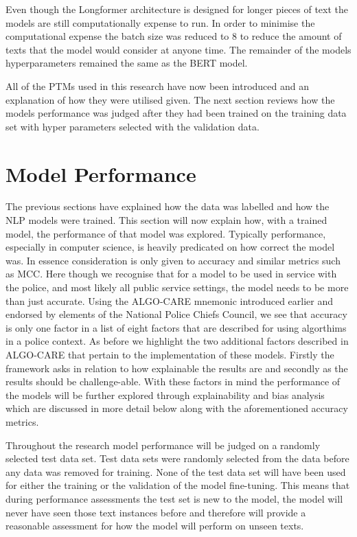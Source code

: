Even though the Longformer architecture is designed for longer pieces of text the models are still computationally expense to run. In order to minimise the computational expense the batch size was reduced to 8 to reduce the amount of texts that the model would consider at anyone time. The remainder of the models hyperparameters remained the same as the BERT model.

All of the PTMs used in this research have now been introduced and an explanation of how they were utilised given. The next section reviews how the models performance was judged after they had been trained on the training data set with hyper parameters selected with the validation data.


\section{Model Performance} The previous sections have explained how the data was labelled and how the NLP models were trained. This section will now explain how, with a trained model, the performance of that model was explored. Typically performance, especially in computer science, is heavily predicated on how correct the model was. In essence consideration is only given to accuracy and similar metrics such as MCC. Here though we recognise that for a model to be used in service with the police, and most likely all public service settings, the model needs to be more than just accurate. Using the ALGO-CARE mnemonic introduced earlier and endorsed by elements of the National Police Chiefs Council, we see that accuracy is only one factor in a list of eight factors that are described for using algorthims in a police context. As before we highlight  the two additional factors described in ALGO-CARE that pertain to the implementation of these models. Firstly the framework asks  in relation to how explainable the results are and secondly   as the results should be challenge-able. With these factors in mind the performance of the models will be further explored through explainability and bias analysis which are discussed in more detail below along with the aforementioned accuracy metrics.

Throughout the research model performance will be judged on a randomly selected test data set. Test data sets were randomly selected from the data before any data was removed for training. None of the test data set will have been used for either the training or the validation of the model fine-tuning. This means that during performance assessments the test set is new to the model, the model will never have seen those text instances before and therefore will provide a reasonable assessment for how the model will perform on unseen texts. 


